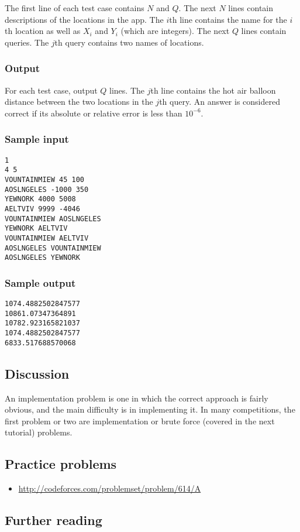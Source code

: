 The first line of each test case contains $N$ and $Q$. The next $N$ lines contain descriptions of the locations in the app. The $i$th line contains the name for the $i$th location as well as $X_i$ and $Y_i$ (which are integers). The next $Q$ lines contain queries. The $j$th query contains two names of locations.

\subsubsection*{Output}

For each test case, output $Q$ lines. The $j$th line contains the hot air balloon distance between the two locations in the $j$th query. An answer is considered correct if its absolute or relative error is less than $10^{-6}$.

\subsubsection*{Sample input}

\begin{verbatim}
1
4 5
VOUNTAINMIEW 45 100
AOSLNGELES -1000 350
YEWNORK 4000 5008
AELTVIV 9999 -4046
VOUNTAINMIEW AOSLNGELES
YEWNORK AELTVIV
VOUNTAINMIEW AELTVIV
AOSLNGELES VOUNTAINMIEW
AOSLNGELES YEWNORK
\end{verbatim}

\subsubsection*{Sample output}

\begin{verbatim}
1074.4882502847577
10861.07347364891
10782.923165821037
1074.4882502847577
6833.517688570068
\end{verbatim}

\subsection*{Discussion}

An implementation problem is one in which the correct approach is fairly obvious, and the main difficulty is in implementing it. In many competitions, the first problem or two are implementation or brute force (covered in the next tutorial) problems.

\subsection*{Practice problems}

\begin{itemize}
\item \url{http://codeforces.com/problemset/problem/614/A}
\end{itemize}

\subsection*{Further reading}
